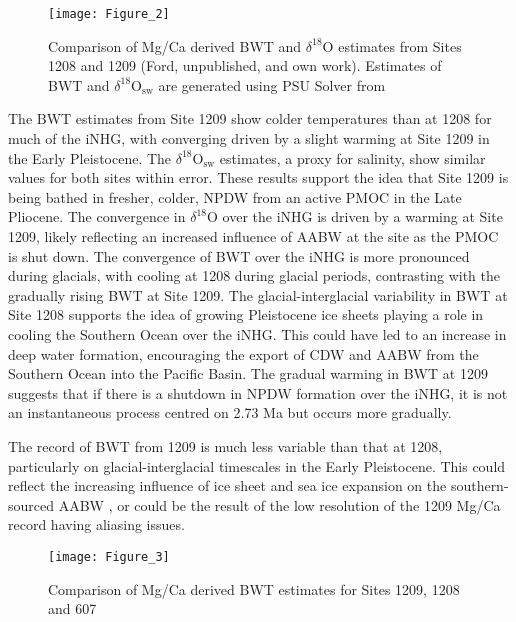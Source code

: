 \begin{figure}[h]
    \centering
    \texttt{[image: Figure\_2]}
    \caption{Comparison of Mg/Ca derived BWT and $\delta^{18}\text{O}$ estimates from Sites 1208  \citep{woodardAntarcticRoleNorthern2014, ventiPaleoproductivityNorthwesternPacific2017} and 1209 (Ford, unpublished, and own work). Estimates of BWT and $\delta^{18}\text{O}_\text{sw}$ are generated using PSU Solver from \citet{thirumalaiConstrainingSeawater182016}}
    \label{fig:results_02}
\end{figure}

The BWT estimates from Site 1209 show colder temperatures than at 1208 for much of the iNHG, with converging driven by a slight warming at Site 1209 in the Early Pleistocene. The $\delta^{18}\text{O}_\text{sw}$ estimates, a proxy for salinity, show similar values for both sites within error. These results support the idea that Site 1209 is being bathed in fresher, colder, NPDW from an active PMOC in the Late Pliocene. The convergence in $\delta^{18}\text{O}$ over the iNHG is driven by a warming at Site 1209, likely reflecting an increased influence of AABW at the site as the PMOC is shut down. The convergence of BWT over the iNHG is more pronounced during glacials, with cooling at 1208 during glacial periods, contrasting with the gradually rising BWT at Site 1209. The glacial-interglacial variability in BWT at Site 1208 supports the idea of growing Pleistocene ice sheets playing a role in cooling the Southern Ocean over the iNHG. This could have led to an increase in deep water formation, encouraging the export of CDW and AABW from the Southern Ocean into the Pacific Basin. The gradual warming in BWT at 1209 suggests that if there is a shutdown in NPDW formation over the iNHG, it is not an instantaneous process centred on 2.73 Ma but occurs more gradually.

The record of BWT from 1209 is much less variable than that at 1208, particularly on glacial-interglacial timescales in the Early Pleistocene. This could reflect the increasing influence of ice sheet and sea ice expansion on the southern-sourced AABW \citep{hillModelledOceanChanges2017}, or could be the result of the low resolution of the 1209 Mg/Ca record having aliasing issues.

\begin{figure}[h]
    \centering
    \texttt{[image: Figure\_3]}
    \caption{Comparison of Mg/Ca derived BWT estimates for Sites 1209, 1208 \citep{woodardAntarcticRoleNorthern2014} and 607 \citep{sosdianDeepSeaTemperatureIce2009}}
    \label{fig:results_03}
\end{figure}

